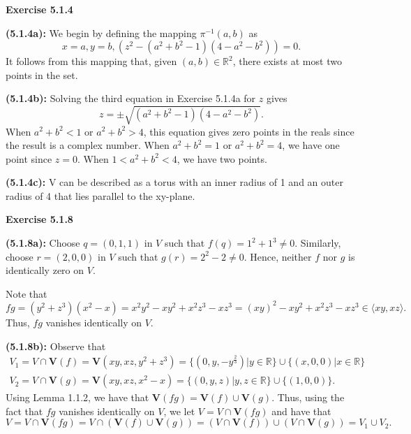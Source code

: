 \documentclass[12pt,oneside]{article}
\newenvironment{exercise}[1]{\vspace{.1in}\noindent\textbf{Exercise #1 \hspace{.05em}}}{}
\newcommand{\R}{\mathbb{R}}
\begin{document}
\begin{exercise}{5.1.4}
    
    \bigskip
    \textbf{(5.1.4a):}
    We begin by defining the mapping $\pi^{-1}(a,b)$ as 
    \[
        x=a, y=b, (z^2-(a^2+b^2-1)(4-a^2-b^2))=0.    
    \]
    It follows from this mapping that, given $(a,b) \in \R^2$, 
    there exists at most two points in the set.
    
    \bigskip
    \textbf{(5.1.4b):}
    Solving the third equation in Exercise 5.1.4a for $z$ gives 
    \[
        z = \pm \sqrt{(a^2+b^2-1)(4-a^2-b^2)}.    
    \]
    When $a^2+b^2 < 1$ or $a^2+b^2 > 4$, this equation gives zero 
    points in the reals since the result is a complex number. 
    When $a^2+b^2 = 1$ or $a^2+b^2 = 4$, we have one point since 
    $z = 0$. When $1 < a^2+b^2 < 4$, we have two points.
    
    \bigskip
    \textbf{(5.1.4c):}
    V can be described as a torus with an inner radius of 1 and 
    an outer radius of 4 that lies parallel to the xy-plane.

\end{exercise}


\begin{exercise}{5.1.8}

    \bigskip
    \textbf{(5.1.8a):}
    Choose $q = (0,1,1)$ in $V$ such that $f(q) = 1^2+1^3 \neq 0$.
    Similarly, choose $r = (2,0,0)$ in $V$ such that $g(r) = 2^2-2 \neq 0$.
    Hence, neither $f$ nor $g$ is identically zero on $V$.

    Note that 
    \[
        fg = (y^2+z^3)(x^2-x)=x^2y^2-xy^2+x^2z^3-xz^3=(xy)^2-xy^2+x^2z^3-xz^3 \in \langle xy, xz \rangle.    
    \]
    Thus, $fg$ vanishes identically on $V$.

    \bigskip
    \textbf{(5.1.8b):}
    Observe that 
    \begin{align*}
        V_1 = V\cap \mathbf{V}(f) = \mathbf{V}(xy,xz,y^2+z^3) = \{(0,y,-y^{\frac{2}{3}}) \vert y \in \R\}\cup \{(x,0,0) \vert x \in \R\}\\
        V_2 = V\cap \mathbf{V}(g) = \mathbf{V}(xy,xz,x^2-x) = \{(0,y,z) \vert y,z \in \R\} \cup \{(1,0,0)\}.
    \end{align*}
    Using Lemma 1.1.2, we have that 
    $\mathbf{V}(fg) = \mathbf{V}(f) \cup \mathbf{V}(g)$. Thus, using the fact 
    that $fg$ vanishes identically on $V$, we let $V = V \cap \mathbf{V}(fg)$ 
    and have that
    \[
        V = V \cap \mathbf{V}(fg) = V \cap (\mathbf{V}(f) \cup \mathbf{V}(g)) = (V\cap \mathbf{V}(f)) \cup (V \cap \mathbf{V}(g)) = V_1 \cup V_2.  
    \]


\end{exercise}


\end{document}
